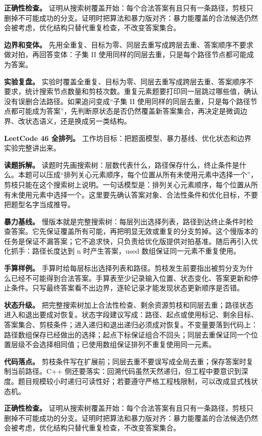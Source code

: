 \textbf{正确性检查。} 证明从搜索树覆盖开始：每个合法答案有且只有一条路径，剪枝只删掉不可能成功的分支。证明时把算法和暴力版对齐：暴力能覆盖的合法候选仍然会被考虑，优化结构只替代重复检查，不改变答案集合。

\textbf{边界和变体。} 先用全重复、目标为零、同层去重写成跨层去重、答案顺序不要求做对拍，再回答变体：子集 II 使用同样的同层去重，只是每个路径节点都可能成为答案。

\textbf{实验复盘。} 实验时覆盖全重复、目标为零、同层去重写成跨层去重、答案顺序不要求，统计搜索节点数量和剪枝次数。重复元素题要打印同一层跳过哪些值，确认没有误删合法路径。如果追问变成“子集 II 使用同样的同层去重，只是每个路径节点都可能成为答案”，先判断原状态是否仍然覆盖新答案集合，再决定是微调边界、改状态语义，还是换成另一类结构。

\noindent\textbf{LeetCode 46 全排列。} 工作坊目标：把题面模型、暴力基线、优化状态和边界实验完整讲出来。

\textbf{读题拆解。} 读题时先画搜索树：层数代表什么，路径保存什么，终止条件是什么。本题可以压成“排列关心元素顺序，每个位置从所有未使用元素中选择一个”，剪枝只能在这个搜索树上说明。一句话模型是：排列关心元素顺序，每个位置从所有未使用元素中选择一个。这里要先确认答案对象、合法性条件和优化目标，不要把题型名字当成推导。

\textbf{暴力基线。} 慢版本就是完整搜索树：每层列出选择列表，路径到达终止条件时检查答案。它先保证覆盖所有可能，再把明显无效或重复的分支剪掉。这个慢版本的任务是保证不漏答案；它不追求快，只负责给优化版提供对拍基准。随后再引入优化抓手：路径长度达到 n 时产生答案，used 数组保证同一元素不重复使用。

\textbf{手算样例。} 手算时给每层标出选择列表和路径。剪枝发生前要指出被剪分支为什么已经不可能得到合法答案。手算表至少记录输入位置、状态变化、答案更新和停止条件。只写最终答案看不出边界，逐轮记录才能发现状态更新顺序是否错。

\textbf{状态升级。} 把完整搜索树加上合法性检查、剩余资源剪枝和同层去重；路径状态进入和退出要成对恢复。状态字段建议写成：路径、起点或使用标记、剩余目标、答案集合、剪枝条件；进入递归和退出递归必须成对恢复。不变量要落到代码上：路径数组保存已经做出的选择；起点下标保证组合不回头；同层去重保证同一个位置层级不会选择相同值；已使用数组保证排列不重复使用同一元素。

\textbf{代码落点。} 剪枝条件写在扩展前；同层去重不要误写成全局去重；保存答案时复制当前路径。C++ 侧还要落实：回溯代码虽然天然递归，但工程中要意识到深度。题目规模较小时递归可读性好；若要遵守严格工程栈限制，可以改成显式栈状态机。

\textbf{正确性检查。} 证明从搜索树覆盖开始：每个合法答案有且只有一条路径，剪枝只删掉不可能成功的分支。证明时把算法和暴力版对齐：暴力能覆盖的合法候选仍然会被考虑，优化结构只替代重复检查，不改变答案集合。

